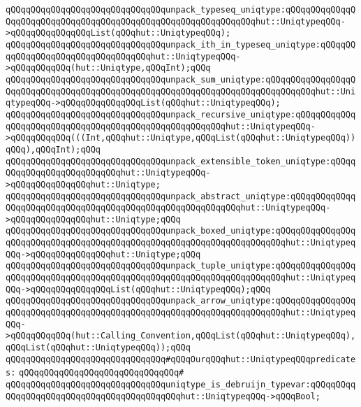 \verb|qQQqqQQqqQQqqQQqqQQqqQQqqQQqqQQqunpack_typeseq_uniqtype:qQQqqQQqqQQqqQQqqQQqqQQqqQQqqQQqqQQqqQQqqQQqqQQqqQQqqQQqqQQqqQQqhut::UniqtypeqQQq->qQQqqQQqqQQqqQQqList(qQQqhut::UniqtypeqQQq);|\newline
\verb|qQQqqQQqqQQqqQQqqQQqqQQqqQQqqQQqunpack_ith_in_typeseq_uniqtype:qQQqqQQqqQQqqQQqqQQqqQQqqQQqqQQqqQQqhut::UniqtypeqQQq->qQQqqQQqqQQq(hut::Uniqtype,qQQqInt);qQQq|\newline
\verb|qQQqqQQqqQQqqQQqqQQqqQQqqQQqqQQqunpack_sum_uniqtype:qQQqqQQqqQQqqQQqqQQqqQQqqQQqqQQqqQQqqQQqqQQqqQQqqQQqqQQqqQQqqQQqqQQqqQQqqQQqqQQqhut::UniqtypeqQQq->qQQqqQQqqQQqqQQqList(qQQqhut::UniqtypeqQQq);|\newline
\verb|qQQqqQQqqQQqqQQqqQQqqQQqqQQqqQQqunpack_recursive_uniqtype:qQQqqQQqqQQqqQQqqQQqqQQqqQQqqQQqqQQqqQQqqQQqqQQqqQQqqQQqhut::UniqtypeqQQq->qQQqqQQqqQQq(((Int,qQQqhut::Uniqtype,qQQqList(qQQqhut::UniqtypeqQQq))qQQq),qQQqInt);qQQq|\newline
\verb|qQQqqQQqqQQqqQQqqQQqqQQqqQQqqQQqunpack_extensible_token_uniqtype:qQQqqQQqqQQqqQQqqQQqqQQqqQQqhut::UniqtypeqQQq->qQQqqQQqqQQqqQQqhut::Uniqtype;|\newline
\verb|qQQqqQQqqQQqqQQqqQQqqQQqqQQqqQQqunpack_abstract_uniqtype:qQQqqQQqqQQqqQQqqQQqqQQqqQQqqQQqqQQqqQQqqQQqqQQqqQQqqQQqqQQqhut::UniqtypeqQQq->qQQqqQQqqQQqqQQqhut::Uniqtype;qQQq|\newline
\verb|qQQqqQQqqQQqqQQqqQQqqQQqqQQqqQQqunpack_boxed_uniqtype:qQQqqQQqqQQqqQQqqQQqqQQqqQQqqQQqqQQqqQQqqQQqqQQqqQQqqQQqqQQqqQQqqQQqqQQqhut::UniqtypeqQQq->qQQqqQQqqQQqqQQqhut::Uniqtype;qQQq|\newline
\verb|qQQqqQQqqQQqqQQqqQQqqQQqqQQqqQQqunpack_tuple_uniqtype:qQQqqQQqqQQqqQQqqQQqqQQqqQQqqQQqqQQqqQQqqQQqqQQqqQQqqQQqqQQqqQQqqQQqqQQqhut::UniqtypeqQQq->qQQqqQQqqQQqqQQqList(qQQqhut::UniqtypeqQQq);qQQq|\newline
\verb|qQQqqQQqqQQqqQQqqQQqqQQqqQQqqQQqunpack_arrow_uniqtype:qQQqqQQqqQQqqQQqqQQqqQQqqQQqqQQqqQQqqQQqqQQqqQQqqQQqqQQqqQQqqQQqqQQqqQQqhut::UniqtypeqQQq->qQQqqQQqqQQq(hut::Calling_Convention,qQQqList(qQQqhut::UniqtypeqQQq),qQQqList(qQQqhut::UniqtypeqQQq));qQQq|\newline
\newline
\verb|qQQqqQQqqQQqqQQqqQQqqQQqqQQqqQQq#qQQqOurqQQqhut::UniqtypeqQQqpredicates:|\newline
\verb|qQQqqQQqqQQqqQQqqQQqqQQqqQQqqQQq#|\newline
\verb|qQQqqQQqqQQqqQQqqQQqqQQqqQQqqQQquniqtype_is_debruijn_typevar:qQQqqQQqqQQqqQQqqQQqqQQqqQQqqQQqqQQqqQQqqQQqhut::UniqtypeqQQq->qQQqBool;|\newline
